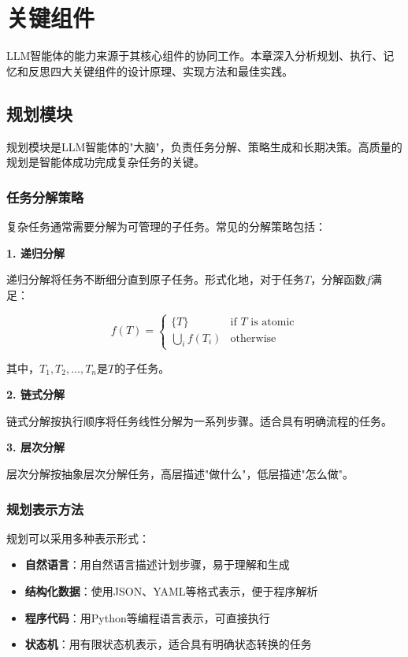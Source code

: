 \section{关键组件}\label{sec:components}

LLM智能体的能力来源于其核心组件的协同工作。本章深入分析规划、执行、记忆和反思四大关键组件的设计原理、实现方法和最佳实践。

\subsection{规划模块}

规划模块是LLM智能体的"大脑"，负责任务分解、策略生成和长期决策。高质量的规划是智能体成功完成复杂任务的关键。

\subsubsection{任务分解策略}

复杂任务通常需要分解为可管理的子任务。常见的分解策略包括：

\textbf{1. 递归分解}

递归分解将任务不断细分直到原子任务。形式化地，对于任务$T$，分解函数$f$满足：

\begin{equation}
    f(T) = \begin{cases}
        \{T\} & \text{if } T \text{ is atomic} \\
        \bigcup_{i} f(T_i) & \text{otherwise}
    \end{cases}
\end{equation}

其中，$T_1, T_2, \ldots, T_n$是$T$的子任务。

\textbf{2. 链式分解}

链式分解按执行顺序将任务线性分解为一系列步骤。适合具有明确流程的任务。

\textbf{3. 层次分解}

层次分解按抽象层次分解任务，高层描述"做什么"，低层描述"怎么做"。

\subsubsection{规划表示方法}

规划可以采用多种表示形式：

\begin{itemize}[leftmargin=2em]
    \item \textbf{自然语言}：用自然语言描述计划步骤，易于理解和生成
    \item \textbf{结构化数据}：使用JSON、YAML等格式表示，便于程序解析
    \item \textbf{程序代码}：用Python等编程语言表示，可直接执行
    \item \textbf{状态机}：用有限状态机表示，适合具有明确状态转换的任务
\end{itemize}

